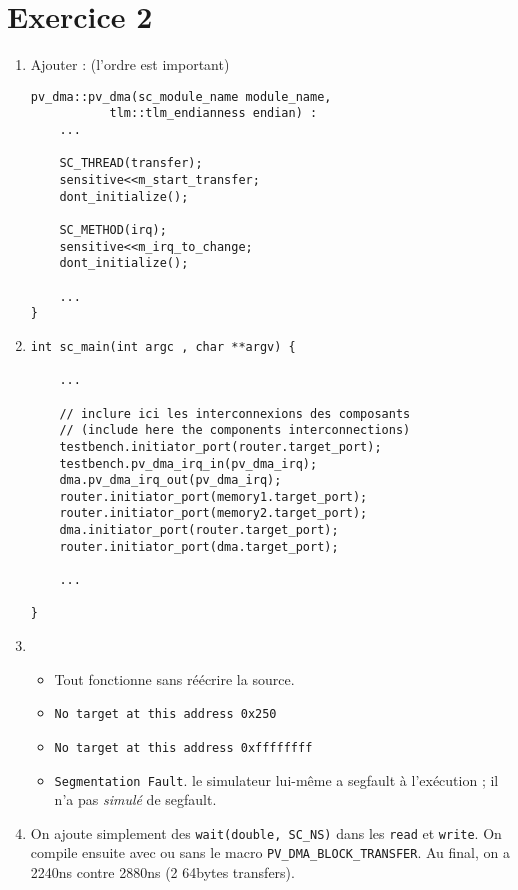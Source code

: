 \documentclass[11pt]{article}
\begin{document}
\section*{Exercice 2}
\begin{enumerate}
    \item Ajouter : (l'ordre est important)
    \begin{verbatim}
pv_dma::pv_dma(sc_module_name module_name,
	       tlm::tlm_endianness endian) :
    ...

    SC_THREAD(transfer);
    sensitive<<m_start_transfer;
    dont_initialize();

    SC_METHOD(irq);
    sensitive<<m_irq_to_change;
    dont_initialize();

    ...
}
    \end{verbatim}
    \item
    \begin{verbatim}
int sc_main(int argc , char **argv) {

    ...

    // inclure ici les interconnexions des composants
    // (include here the components interconnections)
    testbench.initiator_port(router.target_port);
    testbench.pv_dma_irq_in(pv_dma_irq);
    dma.pv_dma_irq_out(pv_dma_irq);
    router.initiator_port(memory1.target_port);
    router.initiator_port(memory2.target_port);
    dma.initiator_port(router.target_port);
    router.initiator_port(dma.target_port);

    ...

}

    \end{verbatim}
    \item   \begin{itemize}
                \item Tout fonctionne sans réécrire la source.
                \item \texttt{No target at this address 0x250}
                \item \texttt{No target at this address 0xffffffff}
                \item \texttt{Segmentation Fault}. le simulateur lui-même a segfault à l'exécution ; il n'a pas \emph{simulé} de segfault.
            \end{itemize}
    \item On ajoute simplement des \texttt{wait(double, SC\_NS)} dans les \texttt{read} et \texttt{write}. On compile ensuite avec ou sans le macro \texttt{PV\_DMA\_BLOCK\_TRANSFER}.
    Au final, on a 2240ns contre 2880ns (2 64bytes transfers).


\end{enumerate}
\end{document}
